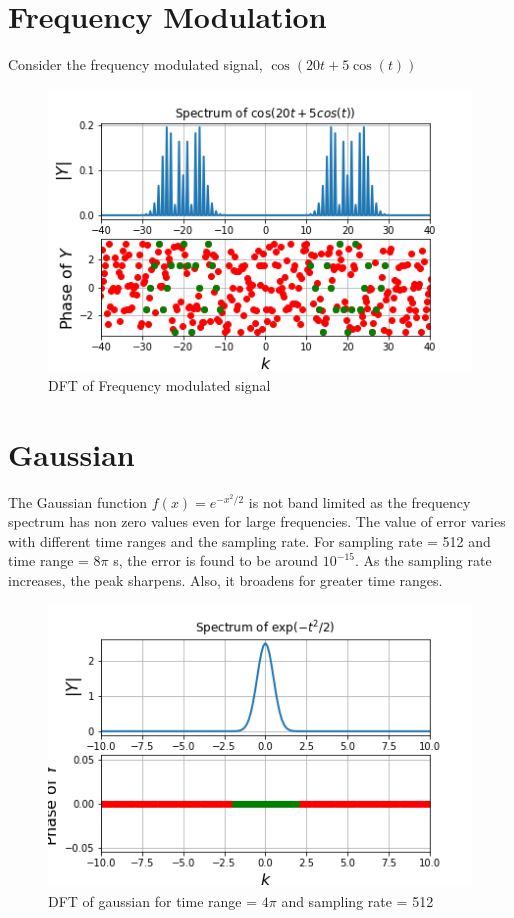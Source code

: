 \documentclass[11pt, a4paper]{article}
\begin{document}
\newpage
\section{Frequency Modulation}
Consider the frequency modulated signal, $\cos(20t + 5\cos(t))$
\begin{figure}[!tbh]
   	\centering
   	\includegraphics[scale=0.8]{fig5.png}  %
   	\caption{DFT of Frequency modulated signal}
   	\label{fig:sample}
   \end{figure} 
   
   
\newpage
\section{Gaussian}
The Gaussian function $f(x) = e^{-x^2/2}$ is not band limited as the frequency spectrum has non zero values even for large frequencies.
The value of error varies with different time ranges and the sampling rate. For sampling rate = 512 and time range = $8\pi$ s, the error is found to be around $10^{-15}$.
As the sampling rate increases, the peak sharpens. Also, it broadens for greater time ranges.
\begin{figure}[!tbh]
   	\centering
   	\includegraphics[scale=0.8]{fig6.png}  %
   	\caption{DFT of gaussian for time range = $4\pi$ and sampling rate = 512}
   	\label{fig:sample}
   \end{figure} 
\end{document}
